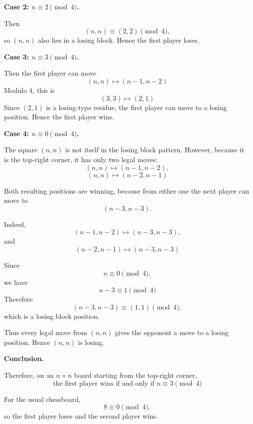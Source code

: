 \medskip
\noindent\textbf{Case 2: \(n\equiv2\pmod4\).}

Then
\[
(n,n)\equiv(2,2)\pmod4,
\]
so \((n,n)\) also lies in a losing block. Hence the first player loses.

\medskip
\noindent\textbf{Case 3: \(n\equiv3\pmod4\).}

Then the first player can move
\[
(n,n)\mapsto(n-1,n-2)
\]
Modulo \(4\), this is
\[
(3,3)\mapsto(2,1)
\]
Since \((2,1)\) is a losing-type residue, the first player can move to a losing position. Hence the first player wins.

\medskip
\noindent\textbf{Case 4: \(n\equiv0\pmod4\).}

The square \((n,n)\) is not itself in the losing block pattern. However, because it is the top-right corner, it has only two legal moves:
\[
(n,n)\mapsto(n-1,n-2),
\]
\[
(n,n)\mapsto(n-2,n-1)
\]

Both resulting positions are winning, because from either one the next player can move to
\[
(n-3,n-3).
\]

Indeed,
\[
(n-1,n-2)\mapsto(n-3,n-3),
\]
and
\[
(n-2,n-1)\mapsto(n-3,n-3)
\]

Since
\[
n\equiv0\pmod4,
\]
we have
\[
n-3\equiv1\pmod4
\]
Therefore
\[
(n-3,n-3)\equiv(1,1)\pmod4,
\]
which is a losing block position.

Thus every legal move from \((n,n)\) gives the opponent a move to a losing position. Hence \((n,n)\) is losing.

\medskip
\noindent\textbf{Conclusion.}

Therefore, on an \(n\times n\) board starting from the top-right corner,
\[
\text{the first player wins if and only if } n\equiv3\pmod4
\]

For the usual chessboard,
\[
8\equiv0\pmod4,
\]
so the first player loses and the second player wins.
